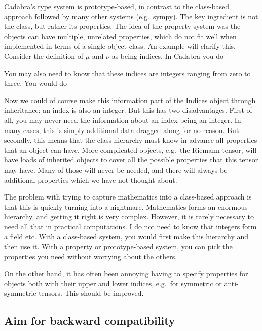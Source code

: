 \documentclass[11pt]{article}
\begin{document}
Cadabra's type system is prototype-based, in contrast to the
class-based approach followed by many other systems (e.g.~sympy). 
The key ingredient is not the class, but rather its properties.
The idea of the property system was the objects can have multiple,
unrelated properties, which do not fit well when implemented in terms
of a single object class. An example will clarify this. Consider the
definition of $\mu$ and $\nu$ as being indices. In Cadabra you do
\begin{quote}
\end{quote}
You may also need to know that these indices are integers ranging from
zero to three. You would do
\begin{quote}
\end{quote}
Now we could of course make this information part of the Indices
object through inheritance: an index is also an integer. But this has
two disadvantages. First of all, you may never need the information
about an index being an integer. In many cases, this is simply
additional data dragged along for no reason. But secondly, this means
that the class hierarchy must know in advance all properties that an
object can have. More complicated objects, e.g.~the Riemann tensor,
will have loads of inherited objects to cover all the possible
properties that this tensor may have. Many of those will never be
needed, and there will always be additional properties which we have
not thought about. 

The problem with trying to capture mathematics into a class-based
approach is that this is quickly turning into a nightmare. Mathematics
forms an enormous hierarchy, and getting it right is very
complex. However, it is rarely necessary to need all that in practical
computations. I do not need to know that integers form a field
etc. With a class-based system, you would first make this hierarchy
and then use it. With a property or prototype-based system, you can
pick the properties you need without worrying about the others.



On the other hand, it has often been annoying having to specify
properties for objects both with their upper and lower indices,
e.g.~for symmetric or anti-symmetric tensors. This should be improved.


\subsection{Aim for backward compatibility}
\end{document}
